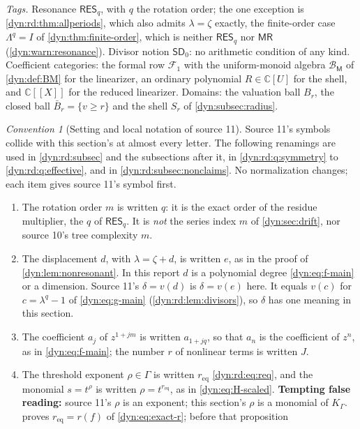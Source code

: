 \documentclass[11pt,letterpaper]{article}
\theoremstyle{definition}
\theoremstyle{remark}
\newtheorem{convention}[convention]{Convention}
\newcommand{\C}{\mathbb C}
\newcommand{\BB}{\mathscr B}
\newcommand{\sdz}{\mathsf{SD}_{0}}
\newcommand{\resq}{\mathsf{RES}_q}
\newcommand{\mres}{\mathsf{MR}}
\numberwithin{equation}{section}
\begin{document}
\emph{Tags.} Resonance $\resq$, with $q$ the rotation order; the one
exception is \cref{dyn:rd:thm:allperiods}, which also admits $\lambda=\zeta$
exactly, the finite-order case $\Lambda^{q}=I$ of \cref{dyn:thm:finite-order},
which is neither $\resq$ nor $\mres$ (\cref{dyn:warn:resonance}). Divisor
notion $\sdz$: no arithmetic condition of any kind. Coefficient categories:
the formal row $\mathcal F_1$ with the uniform-monoid algebra
$\BB_{\mathsf M}$ of \cref{dyn:def:BM} for the linearizer, an ordinary
polynomial $R\in\C[U]$ for the shell, and $\C[[X]]$ for the reduced
linearizer. Domains: the valuation ball $B_r$, the closed ball
$\bar B_r=\{v\ge r\}$ and the shell $S_r$ of \cref{dyn:subsec:radius}.

\begin{convention}[Setting and local notation of source 11]
\label{dyn:rd:conv}
Source 11's symbols collide with this section's at almost every letter. The
following renamings are used in \cref{dyn:rd:subsec} and the subsections
after it, in \cref{dyn:rd:q:symmetry} to \cref{dyn:rd:q:effective}, and in
\cref{dyn:rd:subsec:nonclaims}. No normalization changes; each item gives
source 11's symbol first.
\begin{enumerate}[label=(\roman*)]
\item The rotation order $m$ is written $q$: it is the exact order of the
residue multiplier, the $q$ of $\resq$. It is \emph{not} the series index
$m$ of \cref{dyn:sec:drift}, nor source 10's tree complexity $m$.
\item The displacement $d$, with $\lambda=\zeta+d$, is written $e$, as in
the proof of \cref{dyn:lem:nonresonant}. In this report $d$ is a polynomial
degree \eqref{dyn:eq:f-main} or a dimension. Source 11's
$\delta=v(d)$ is $\delta=v(e)$ here. It equals $v(c)$ for
$c=\lambda^{q}-1$ of \eqref{dyn:eq:g-main} (\cref{dyn:rd:lem:divisors}), so
$\delta$ has one meaning in this section.
\item The coefficient $a_j$ of $z^{1+jm}$ is written $a_{1+jq}$, so that
$a_n$ is the coefficient of $z^{n}$, as in \eqref{dyn:eq:f-main}; the
number $r$ of nonlinear terms is written $J$.
\item The threshold exponent $\rho\in\Gamma$ is written $r_{\mathrm{eq}}$
\eqref{dyn:rd:eq:req}, and the monomial $s=t^{\rho}$ is written
$\rho=t^{r_{\mathrm{eq}}}$, as in \eqref{dyn:eq:H-scaled}. \textbf{Tempting
false reading:} source 11's $\rho$ is an exponent; this section's $\rho$ is
a monomial of $K_\Gamma$.  proves
$r_{\mathrm{eq}}=r(f)$ of \eqref{dyn:eq:exact-r}; before that proposition

\end{enumerate}
\end{convention}
\end{document}
